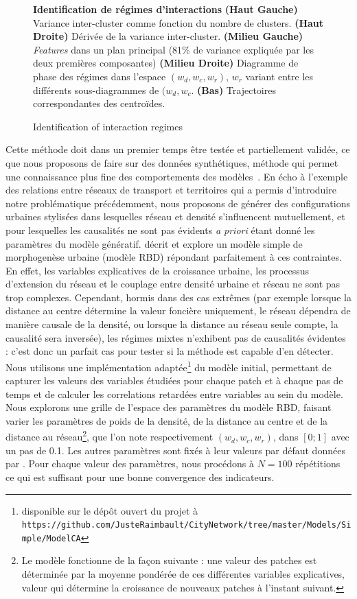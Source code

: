 \begin{figure}
\caption{Identification of interaction regimes}{\textbf{Identification de régimes d'interactions} \textbf{(Haut Gauche)} Variance inter-cluster comme fonction du nombre de clusters. \textbf{(Haut Droite)} Dérivée de la variance inter-cluster. \textbf{(Milieu Gauche)} \emph{Features} dans un plan principal (81\% de variance expliquée par les deux premières composantes) \textbf{(Milieu Droite)} Diagramme de phase des régimes dans l'espace $(w_{d},w_{c},w_{r})$, $w_r$ variant entre les différents sous-diagrammes de $(w_{d},w_{c}$. \textbf{(Bas)} Trajectoires correspondantes des centroïdes.}
\label{fig:clustering}
\end{figure}



Cette méthode doit dans un premier temps être testée et partiellement validée, ce que nous proposons de faire sur des données synthétiques, méthode qui permet une connaissance plus fine des comportements des modèles~\cite{raimbault2016generation}. En écho à l'exemple des relations entre réseaux de transport et territoires qui a permis d'introduire notre problématique précédemment, nous proposons de générer des configurations urbaines stylisées dans lesquelles réseau et densité s'influencent mutuellement, et pour lesquelles les causalités ne sont pas évidents \emph{a priori} étant donné les paramètres du modèle génératif. \cite{raimbault2014hybrid} décrit et explore un modèle simple de morphogenèse urbaine (modèle RBD) répondant parfaitement à ces contraintes. En effet, les variables explicatives de la croissance urbaine, les processus d'extension du réseau et le couplage entre densité urbaine et réseau ne sont pas trop complexes. Cependant, hormis dans des cas extrêmes (par exemple lorsque la distance au centre détermine la valeur foncière uniquement, le réseau dépendra de manière causale de la densité, ou lorsque la distance au réseau seule compte, la causalité sera inversée), les régimes mixtes n'exhibent pas de causalités évidentes : c'est donc un parfait cas pour tester si la méthode est capable d'en détecter. Nous utilisons une implémentation adaptée\footnote{disponible sur le dépôt ouvert du projet à\\\texttt{https://github.com/JusteRaimbault/CityNetwork/tree/master/Models/Simple/ModelCA}} du modèle initial, permettant de capturer les valeurs des variables étudiées pour chaque patch et à chaque pas de temps et de calculer les correlations retardées entre variables au sein du modèle. Nous explorons une grille de l'espace des paramètres du modèle RBD, faisant varier les paramètres de poids de la densité, de la distance au centre et de la distance au réseau\footnote{Le modèle fonctionne de la façon suivante : une valeur des patches est déterminée par la moyenne pondérée de ces différentes variables explicatives, valeur qui détermine la croissance de nouveaux patches à l'instant suivant.}, que l'on note respectivement $(w_{d},w_{c},w_{r})$, dans $\left[0;1\right]$ avec un pas de 0.1. Les autres paramètres sont fixés à leur valeurs par défaut données par \cite{raimbault2014hybrid}. Pour chaque valeur des paramètres, nous procédons à $N=100$ répétitions ce qui est suffisant pour une bonne convergence des indicateurs. 